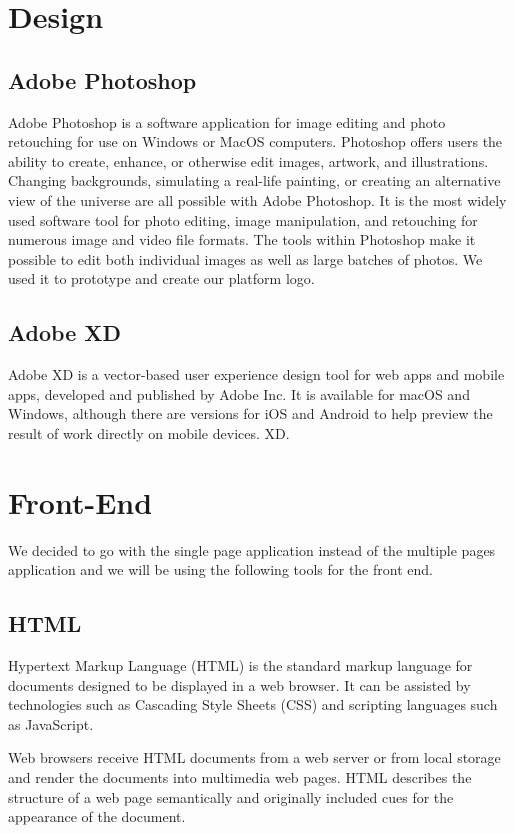 \section{Design}
\subsection{Adobe Photoshop}
Adobe Photoshop is a software application for image editing and photo retouching for use on Windows or MacOS computers. Photoshop offers users the ability to create, enhance, or otherwise edit images, artwork, and illustrations. Changing backgrounds, simulating a real-life painting, or creating an alternative view of the universe are all possible with Adobe Photoshop. It is the most widely used software tool for photo editing, image manipulation, and retouching for numerous image and video file formats. The tools within Photoshop make it possible to edit both individual images as well as large batches of photos.
We used it to prototype and create our platform logo.
\subsection{Adobe XD}
Adobe XD is a vector-based user experience design tool for web apps and mobile apps, developed and published by Adobe Inc. It is available for macOS and Windows, although there are versions for iOS and Android to help preview the result of work directly on mobile devices. XD.


\section{Front-End}
We decided to go with the single page application instead of the multiple pages application and we will be using the following tools for the front end.
\subsection{HTML}
Hypertext Markup Language (HTML) is the standard markup language for documents designed to be displayed in a web browser. It can be assisted by technologies such as Cascading Style Sheets (CSS) and scripting languages such as JavaScript.

Web browsers receive HTML documents from a web server or from local storage and render the documents into multimedia web pages. HTML describes the structure of a web page semantically and originally included cues for the appearance of the document.



